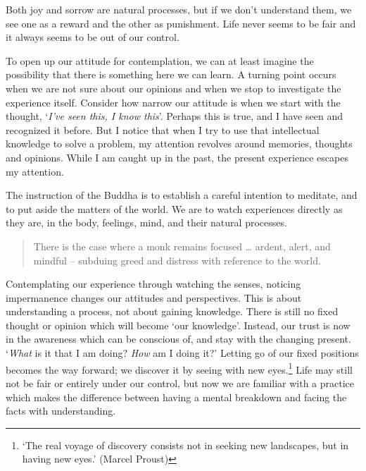 Both joy and sorrow are natural processes, but if we don't understand
them, we see one as a reward and the other as punishment. Life never
seems to be fair and it always seems to be out of our control.

To open up our attitude for contemplation, we can at least imagine the
possibility that there is something here we can learn. A turning point
occurs when we are not sure about our opinions and when we stop to
investigate the experience itself. Consider how narrow our attitude is
when we start with the thought, `\emph{I've seen this, I know this}'.
Perhaps this is true, and I have seen and recognized it before. But I
notice that when I try to use that intellectual knowledge to solve a
problem, my attention revolves around memories, thoughts and opinions.
While I am caught up in the past, the present experience escapes my
attention.

The instruction of the Buddha is to establish a careful intention to
meditate, and to put aside the matters of the world. We are to watch
experiences directly as they are, in the body, feelings, mind, and their
natural processes.

\begin{quote}
There is the case where a monk remains focused \ldots{} ardent, alert,
and mindful -- subduing greed and distress with reference to the world.

\bigskip

\end{quote}

Contemplating our experience through watching the senses, noticing
impermanence changes our attitudes and perspectives. This is about
understanding a process, not about gaining knowledge. There is still no
fixed thought or opinion which will become `our knowledge'. Instead, our
trust is now in the awareness which can be conscious of, and stay with
the changing present. `\emph{What} is it that I am doing? \emph{How} am
I doing it?' Letting go of our fixed positions becomes the way forward;
we discover it by seeing with new eyes.\footnote{`The real voyage of
  discovery consists not in seeking new landscapes, but in having new
  eyes.' (Marcel Proust)} Life may still not be fair or entirely under
our control, but now we are familiar with a practice which makes the
difference between having a mental breakdown and facing the facts with
understanding.

